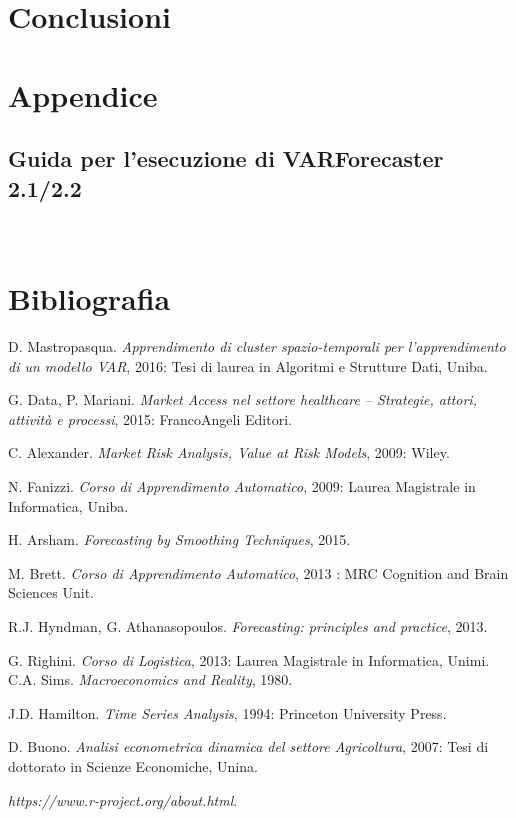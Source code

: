 \documentclass[12pt,a4paper,twoside,openright]{book}
\begin{document}
\chapter{Conclusioni}
\chapter{Appendice}
\section{Guida per l’esecuzione di VARForecaster 2.1/2.2}\
\chapter{Bibliografia}
  \begin{thebibliography}{1}

   D. Mastropasqua. {\em Apprendimento di cluster spazio-temporali per l'apprendimento di un modello VAR}, 2016: Tesi di laurea in Algoritmi e Strutture Dati, Uniba.

   G. Data, P. Mariani. {\em Market Access nel settore healthcare – Strategie, attori, attività e processi}, 2015:  FrancoAngeli Editori.

   C. Alexander. {\em Market Risk Analysis, Value at Risk Models}, 2009: Wiley.

   N. Fanizzi. {\em Corso di Apprendimento Automatico}, 2009: Laurea Magistrale in Informatica, Uniba.
  
   H. Arsham. {\em Forecasting by Smoothing Techniques}, 2015.
  
   M. Brett. {\em Corso di Apprendimento Automatico}, 2013 : MRC Cognition and Brain Sciences Unit.
  
     R.J. Hyndman, G. Athanasopoulos. {\em Forecasting: principles and practice}, 2013.
    
     G. Righini. {\em Corso di Logistica}, 2013: Laurea Magistrale in Informatica, Unimi.
    \bibitem{9a} C.A. Sims. {\em Macroeconomics and Reality}, 1980.
    
     J.D. Hamilton. {\em Time Series Analysis}, 1994: Princeton University Press.
   
     D. Buono. {\em Analisi econometrica dinamica del settore Agricoltura}, 2007: Tesi di dottorato in Scienze Economiche, Unina.
    
     {\em https://www.r-project.org/about.html}.
    

\end{thebibliography}
\end{document}
